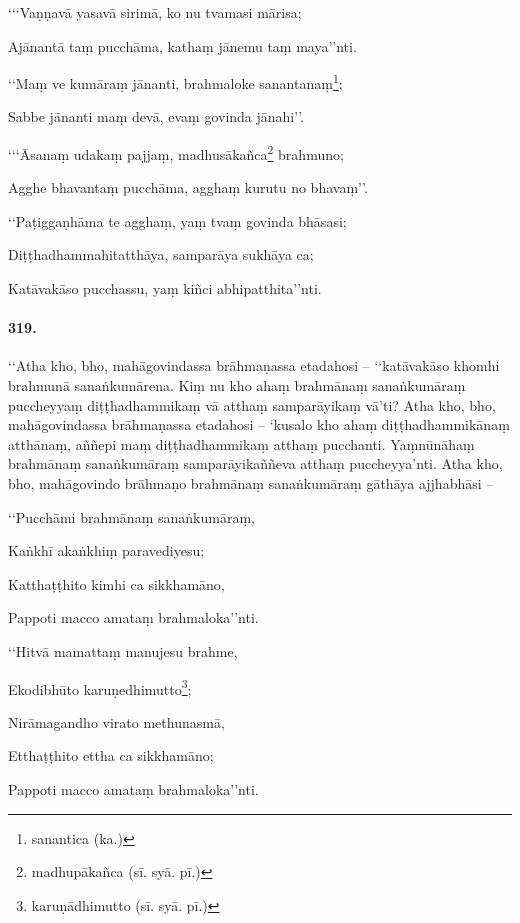 ‘‘‘Vaṇṇavā yasavā sirimā, ko nu tvamasi mārisa;

Ajānantā taṃ pucchāma, kathaṃ jānemu taṃ maya’’nti.

‘‘Maṃ ve kumāraṃ jānanti, brahmaloke sanantanaṃ\footnote{sanantica (ka.)};

Sabbe jānanti maṃ devā, evaṃ govinda jānahi’’.

‘‘‘Āsanaṃ udakaṃ pajjaṃ, madhusākañca\footnote{madhupākañca (sī. syā. pī.)} brahmuno;

Agghe bhavantaṃ pucchāma, agghaṃ kurutu no bhavaṃ’’.

‘‘Paṭiggaṇhāma te agghaṃ, yaṃ tvaṃ govinda bhāsasi;

Diṭṭhadhammahitatthāya, samparāya sukhāya ca;

Katāvakāso pucchassu, yaṃ kiñci abhipatthita’’nti.

\paragraph{319.} ‘‘Atha kho, bho, mahāgovindassa brāhmaṇassa etadahosi – ‘‘katāvakāso khomhi brahmunā sanaṅkumārena. Kiṃ nu kho ahaṃ brahmānaṃ sanaṅkumāraṃ puccheyyaṃ diṭṭhadhammikaṃ vā atthaṃ samparāyikaṃ vā’ti? Atha kho, bho, mahāgovindassa brāhmaṇassa etadahosi – ‘kusalo kho ahaṃ diṭṭhadhammikānaṃ atthānaṃ, aññepi maṃ diṭṭhadhammikaṃ atthaṃ pucchanti. Yaṃnūnāhaṃ brahmānaṃ sanaṅkumāraṃ samparāyikaññeva atthaṃ puccheyya’nti. Atha kho, bho, mahāgovindo brāhmaṇo brahmānaṃ sanaṅkumāraṃ gāthāya ajjhabhāsi –

‘‘Pucchāmi brahmānaṃ sanaṅkumāraṃ,

Kaṅkhī akaṅkhiṃ paravediyesu;

Katthaṭṭhito kimhi ca sikkhamāno,

Pappoti macco amataṃ brahmaloka’’nti.

‘‘Hitvā mamattaṃ manujesu brahme,

Ekodibhūto karuṇedhimutto\footnote{karuṇādhimutto (sī. syā. pī.)};

Nirāmagandho virato methunasmā,

Etthaṭṭhito ettha ca sikkhamāno;

Pappoti macco amataṃ brahmaloka’’nti.

